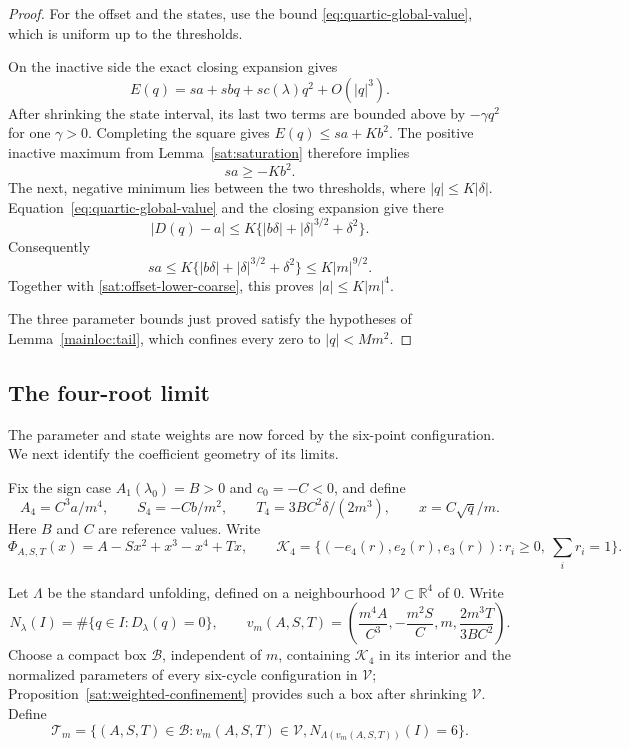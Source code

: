 \begin{proof}
For the offset and the states, use the bound
\eqref{eq:quartic-global-value}, which is uniform up to the thresholds.

On the inactive side the exact closing expansion gives
\[
 E(q)=sa+sbq+sc(\lambda)q^2+O(|q|^3).
\]
After shrinking the state interval, its last two terms are bounded
above by \(-\gamma q^2\) for one \(\gamma>0\). Completing the
square gives \(E(q)\le sa+Kb^2\). The positive inactive maximum
from Lemma~\ref{sat:saturation} therefore implies
\begin{equation}\label{sat:offset-lower-coarse}
 sa\ge-Kb^2.
\end{equation}
The next, negative minimum lies between the two thresholds, where
\(|q|\le K|\delta|\). Equation~\eqref{eq:quartic-global-value} and the
closing expansion give there
\[
 |D(q)-a|\le K\{ |b\delta|+|\delta|^{3/2}+\delta^2\}.
\]
Consequently
\begin{equation}\label{sat:offset-upper-coarse}
 sa\le K\{ |b\delta|+|\delta|^{3/2}+\delta^2\}
       \le K|m|^{9/2}.
\end{equation}
Together with \eqref{sat:offset-lower-coarse}, this proves
\(|a|\le K|m|^4\).

The three parameter bounds just proved satisfy the hypotheses of
Lemma~\ref{mainloc:tail}, which confines every zero to $|q|<Mm^2$.
\end{proof}

\subsection{The four-root limit}\label{subsec:four-root-limit}

The parameter and state weights are now forced by the six-point
configuration. We next identify the coefficient geometry of its limits.

Fix the sign case $A_1(\lambda_0)=B>0$ and $c_0=-C<0$, and define
\[
 A_4=C^3a/m^4,\qquad S_4=-Cb/m^2,\qquad
 T_4=3BC^2\delta/(2m^3),\qquad x=C\sqrt q/m.
\]
Here $B$ and $C$ are reference values. Write
\[
 \Phi_{A,S,T}(x)=A-Sx^2+x^3-x^4+Tx,
 \qquad
 \mathcal K_4=\{(-e_4(r),e_2(r),e_3(r)):r_i\ge0,\ \sum_i r_i=1\}.
\]

Let $\Lambda$ be the standard unfolding, defined on a neighbourhood
$\mathcal V\subset\mathbb R^4$ of $0$. Write
\[
 N_\lambda(I)=\#\{q\in I:D_\lambda(q)=0\},\qquad
 v_m(A,S,T)=\left(\frac{m^4A}{C^3},-\frac{m^2S}{C},m,
                         \frac{2m^3T}{3BC^2}\right).
\]
Choose a compact box $\mathcal B$, independent of $m$, containing
$\mathcal K_4$ in its interior and the normalized parameters of every
six-cycle configuration in $\mathcal V$;
Proposition~\ref{sat:weighted-confinement} provides such a box after
shrinking $\mathcal V$. Define
\begin{equation}\label{def:actual-main-domain}
 \mathscr T_m=\{(A,S,T)\in\mathcal B:v_m(A,S,T)\in\mathcal V,
                    N_{\Lambda(v_m(A,S,T))}(I)=6\}.
\end{equation}

